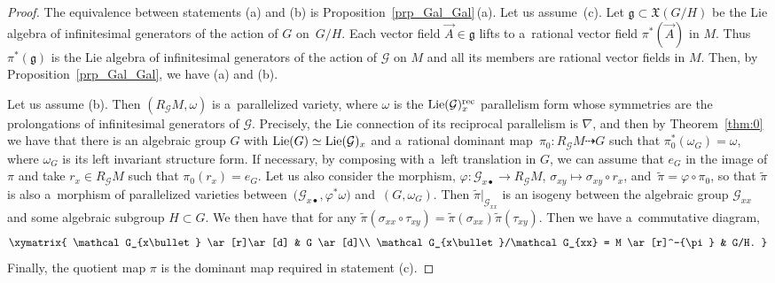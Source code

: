 \documentclass[pdftex]{sigma}
\numberwithin{equation}{section}
\theoremstyle{definition}
\begin{document}
\begin{proof}
The equivalence between statements (a) and (b) is Proposition~\ref{prp_Gal_Gal}\,(a). Let us assume~(c). Let $\mathfrak g \subset \mathfrak X(G/H)$ be the Lie algebra of infinitesimal generators of the action of $G$ on~$G/H$. Each vector field $\vec A\in \mathfrak g$ lifts to a~rational vector field $\pi^*(\vec A)$ in $M$. Thus $\pi^{*}(\mathfrak g)$ is the Lie algebra of infinitesimal generators of the action of $\mathcal G$ on $M$ and all its members are rational vector fields in $M$. Then, by Proposition~\ref{prp_Gal_Gal}, we have (a) and (b).

Let us assume (b). Then $(R_{\mathcal G}M,\omega)$ is a~parallelized variety, where $\omega$ is the ${\rm Lie}(\mathcal G)_x^{\rm rec}$ parallelism form whose symmetries are the prolongations of infinitesimal generators of $\mathcal G$. Precisely, the Lie connection of its reciprocal parallelism is $\nabla$, and then by Theorem~\ref{thm:0} we have that there is an algebraic group $G$ with ${\rm Lie}(G)\simeq {\rm Lie}(\mathcal G)_x$ and a~rational dominant map~${\pi_0\colon R_\mathcal GM\dasharrow G}$ such that $\pi_0^*(\omega_G) = \omega$, where $\omega_G$ is its left invariant structure form. If necessary, by composing with a~left translation in $G$, we can assume that $e_G$ in the image of $\pi$ and take $r_x\in R_\mathcal GM$ such that $\pi_0(r_x) = e_G$. Let us also consider the morphism,
$\varphi \colon \mathcal G_{x\bullet}\to R_\mathcal GM$, $ \sigma_{xy} \mapsto \sigma_{xy}\circ r_x$,
and~${\widetilde\pi = \varphi\circ \pi_0}$, so that $\widetilde\pi$ is also a~morphism of parallelized varieties between~${\bigl(\mathcal G_{x\bullet },\varphi^*\omega\bigr)}$ and~${(G,\omega_G)}$. Then $\widetilde\pi|_{\mathcal G_{xx}}$ is an isogeny between the algebraic group $\mathcal G_{xx}$ and some algebraic subgroup $H\subset G$. We then have that
for any $\widetilde \pi(\sigma_{xx}\circ \tau_{xy}) = \widetilde\pi(\sigma_{xx}) \widetilde\pi(\tau_{xy})$. Then we have a~commutative diagram,
\[
\xymatrix{
\mathcal G_{x\bullet} \ar[r]\ar[d] & G \ar[d]\\
\mathcal G_{x\bullet}/\mathcal G_{xx} = M \ar[r]^-{\pi} & G/H.
}
\]
Finally, the quotient map $\pi$ is the dominant map required in statement (c).
\end{proof}
\end{document}
